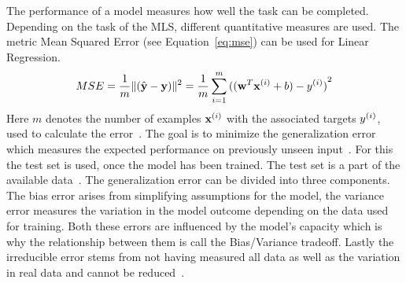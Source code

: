 The performance of a model measures how well the task can be completed.
Depending on the task of the \ac{MLS}, different quantitative measures are used.
The metric Mean Squared Error (see Equation~\ref{eq:mse}) can be used for Linear Regression.
\begin{equation}\label{eq:mse}
    MSE =\frac{1}{m}\lVert{(\hat{\textbf{y}} - \textbf{y})}\rVert^2
        =\frac{1}{m}\sum_{i=1}^m {((\textbf{w}^T \textbf{x}^{(i)} + b) - y^{(i)})}^2
\end{equation}
Here $m$ denotes the number of examples $\textbf{x}^{(i)}$ with the associated targets $y^{(i)}$, used to calculate
the error~\citep{geron_hands-machine_2017,goodfellow_deep_2016}.
The goal is to minimize the generalization error which measures the expected performance on
previously unseen input~\citep{geron_hands-machine_2017}.
For this the test set is used, once the model has been trained.
The test set is a part of the available data~\citep{geron_hands-machine_2017, goodfellow_deep_2016}.
The generalization error can be divided into three components.
The bias error arises from simplifying assumptions for the model, the variance error measures the
variation in the model outcome depending on the data used for training.
Both these errors are influenced by the model's capacity which is why the relationship between them
is call the Bias/Variance tradeoff.
Lastly the irreducible error stems from not having measured all data as well as the variation
in real data and cannot be
reduced~\citep{ashmore_assuring_2021, james_introduction_2013,geron_hands-machine_2017}.

